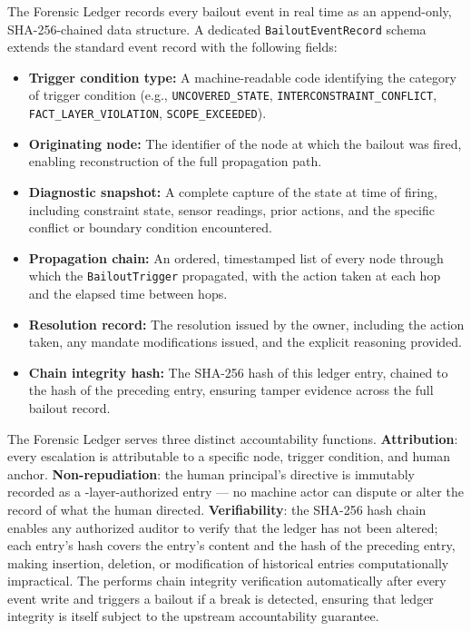 The Forensic Ledger records every bailout event in real time as an append-only, SHA-256-chained data structure. A dedicated \texttt{BailoutEventRecord} schema extends the standard event record with the following fields:

\begin{itemize}
\item \textbf{Trigger condition type:} A machine-readable code identifying the category of trigger condition (e.g., \texttt{UNCOVERED\_STATE}, \texttt{INTERCONSTRAINT\_CONFLICT}, \texttt{FACT\_LAYER\_VIOLATION}, \texttt{SCOPE\_EXCEEDED}).
\item \textbf{Originating node:} The identifier of the \bounds{} node at which the bailout was fired, enabling reconstruction of the full propagation path.
\item \textbf{Diagnostic snapshot:} A complete capture of the \bounds{} state at time of firing, including constraint state, sensor readings, prior actions, and the specific conflict or boundary condition encountered.
\item \textbf{Propagation chain:} An ordered, timestamped list of every node through which the \texttt{BailoutTrigger} propagated, with the action taken at each hop and the elapsed time between hops.
\item \textbf{Resolution record:} The resolution issued by the \purpose{} owner, including the action taken, any mandate modifications issued, and the explicit reasoning provided.
\item \textbf{Chain integrity hash:} The SHA-256 hash of this ledger entry, chained to the hash of the preceding entry, ensuring tamper evidence across the full bailout record.
\end{itemize}

The Forensic Ledger serves three distinct accountability functions. \textbf{Attribution}: every escalation is attributable to a specific node, trigger condition, and human anchor. \textbf{Non-repudiation}: the human principal's directive is immutably recorded as a \purpose{}-layer-authorized entry — no machine actor can dispute or alter the record of what the human directed. \textbf{Verifiability}: the SHA-256 hash chain enables any authorized auditor to verify that the ledger has not been altered; each entry's hash covers the entry's content and the hash of the preceding entry, making insertion, deletion, or modification of historical entries computationally impractical. The \fact{} performs chain integrity verification automatically after every event write and triggers a bailout if a break is detected, ensuring that ledger integrity is itself subject to the upstream accountability guarantee.

